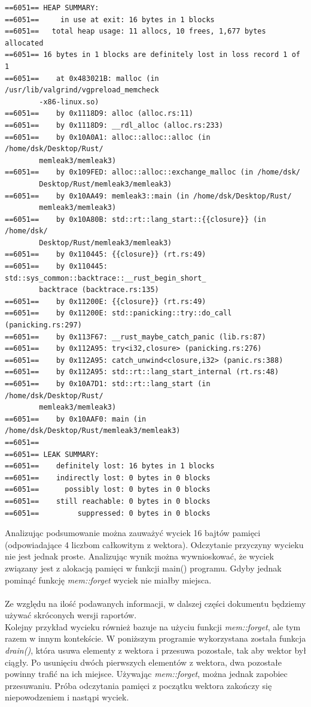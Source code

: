 \documentclass[12pt]{article}
\begin{document}
\begin{lstlisting}
==6051== HEAP SUMMARY:
==6051==     in use at exit: 16 bytes in 1 blocks
==6051==   total heap usage: 11 allocs, 10 frees, 1,677 bytes allocated
==6051== 16 bytes in 1 blocks are definitely lost in loss record 1 of 1
==6051==    at 0x483021B: malloc (in /usr/lib/valgrind/vgpreload_memcheck
		-x86-linux.so)
==6051==    by 0x1118D9: alloc (alloc.rs:11)
==6051==    by 0x1118D9: __rdl_alloc (alloc.rs:233)
==6051==    by 0x10A0A1: alloc::alloc::alloc (in /home/dsk/Desktop/Rust/
		memleak3/memleak3)
==6051==    by 0x109FED: alloc::alloc::exchange_malloc (in /home/dsk/
		Desktop/Rust/memleak3/memleak3)
==6051==    by 0x10AA49: memleak3::main (in /home/dsk/Desktop/Rust/
		memleak3/memleak3)
==6051==    by 0x10A80B: std::rt::lang_start::{{closure}} (in /home/dsk/
		Desktop/Rust/memleak3/memleak3)
==6051==    by 0x110445: {{closure}} (rt.rs:49)
==6051==    by 0x110445: std::sys_common::backtrace::__rust_begin_short_
		backtrace (backtrace.rs:135)
==6051==    by 0x11200E: {{closure}} (rt.rs:49)
==6051==    by 0x11200E: std::panicking::try::do_call (panicking.rs:297)
==6051==    by 0x113F67: __rust_maybe_catch_panic (lib.rs:87)
==6051==    by 0x112A95: try<i32,closure> (panicking.rs:276)
==6051==    by 0x112A95: catch_unwind<closure,i32> (panic.rs:388)
==6051==    by 0x112A95: std::rt::lang_start_internal (rt.rs:48)
==6051==    by 0x10A7D1: std::rt::lang_start (in /home/dsk/Desktop/Rust/
		memleak3/memleak3)
==6051==    by 0x10AAF0: main (in /home/dsk/Desktop/Rust/memleak3/memleak3)
==6051== 
==6051== LEAK SUMMARY:
==6051==    definitely lost: 16 bytes in 1 blocks
==6051==    indirectly lost: 0 bytes in 0 blocks
==6051==      possibly lost: 0 bytes in 0 blocks
==6051==    still reachable: 0 bytes in 0 blocks
==6051==         suppressed: 0 bytes in 0 blocks
\end{lstlisting}
Analizując podsumowanie można zauważyć wyciek 16 bajtów pamięci (odpowiadające 4 liczbom całkowitym z wektora). Odczytanie przyczyny wycieku nie jest jednak proste. Analizując wynik można wywnioskować, że wyciek związany jest z alokacją pamięci w funkcji main() programu. Gdyby jednak pominąć funkcję \textit{mem::forget} wyciek nie miałby miejsca. \\\\Ze względu na ilość podawanych informacji, w dalszej części dokumentu będziemy używać skróconych wersji raportów.\\
Kolejny przykład wycieku również bazuje na użyciu funkcji \textit{mem::forget}, ale tym razem w innym kontekście. W poniższym programie wykorzystana została funkcja \textit{drain()}, która usuwa elementy z wektora i przesuwa pozostałe, tak aby wektor był ciągły. Po usunięciu dwóch pierwszych elementów z wektora, dwa pozostałe powinny trafić na ich miejsce. Używając \textit{mem::forget}, można jednak zapobiec przesuwaniu. Próba odczytania pamięci z początku wektora zakończy się niepowodzeniem i nastąpi wyciek.
\end{document}
